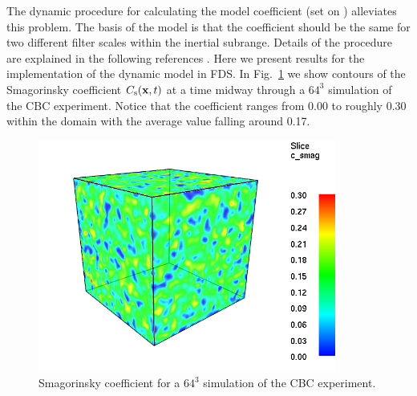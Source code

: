 \documentclass[11pt]{book}
\begin{document}
The dynamic procedure for calculating the model coefficient (set  on ) alleviates this problem.  The basis of the model is that the coefficient should be the same for two different filter scales within the inertial subrange.  Details of the procedure are explained in the following references \cite{Germano:1991,PinoMartin:2000,Moin:1991,Lund:1997,FDS_Math_Guide}.  Here we present results for the implementation of the dynamic model in FDS.  In Fig.~\ref{fig_c_smag} we show contours of the Smagorinsky coefficient $C_{\rm s}(\mathbf{x},t)$ at a time midway through a $64^3$ simulation of the CBC experiment.  Notice that the coefficient ranges from 0.00 to roughly 0.30 within the domain with the average value falling around 0.17.

\begin{figure}[t]
   \begin{center}
      \includegraphics[height=3.00in]{SCRIPT_FIGURES/dsmag_64_300}
      \caption[Dynamic Smagorinsky coefficient]{\label{fig_c_smag} Smagorinsky coefficient for a $64^3$ simulation of the CBC experiment.}
   \end{center}
\end{figure}
\end{document}
